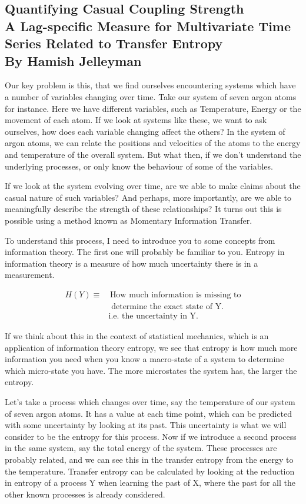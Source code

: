 \subsection{Quantifying Casual Coupling Strength\\{\small A Lag-specific Measure for Multivariate Time Series Related to Transfer Entropy\\
By Hamish Jelleyman}}
Our key problem is this, that we find ourselves encountering systems which have a number of variables changing over time. Take our system of seven argon atoms for instance. Here we have different variables, such as Temperature, Energy or the movement of each atom. If we look at systems like these, we want to ask ourselves, how does each variable changing affect the others? In the system of argon atoms, we can relate the positions and velocities of the atoms to the energy and temperature of the overall system. But what then, if we don’t understand the underlying processes, or only know the behaviour of some of the variables. \medskip

If we look at the system evolving over time, are we able to make claims about the casual nature of such variables? And perhaps, more importantly, are we able to meaningfully describe the strength of these relationships? It turns out this is possible using a method known as Momentary Information Transfer.\medskip

To understand this process, I need to introduce you to some concepts from information theory. The first one will probably be familiar to you. Entropy in information theory is a measure of how much uncertainty there is in a measurement. 

\begin{align*}
H(Y)\equiv&\,
\text{How much information is missing to}\\
&\text{ determine the exact state of Y.}\\
&\text{i.e. the uncertainty in Y.}
\end{align*}

If we think about this in the context of statistical mechanics, which is an application of information theory entropy, we see that entropy is how much more information you need when you know a macro-state of a system to determine which micro-state you have. The more microstates the system has, the larger the entropy.\medskip

Let’s take a process which changes over time, say the temperature of our system of seven argon atoms. It has a value at each time point, which can be predicted with some uncertainty by looking at its past. This uncertainty is what we will consider to be the entropy for this process. Now if we introduce a second process in the same system, say the total energy of the system. These processes are probably related, and we can see this in the transfer entropy from the energy to the temperature. Transfer entropy can be calculated by looking at the reduction in entropy of a process Y when learning the past of X, where the past for all the other known processes is already considered.

